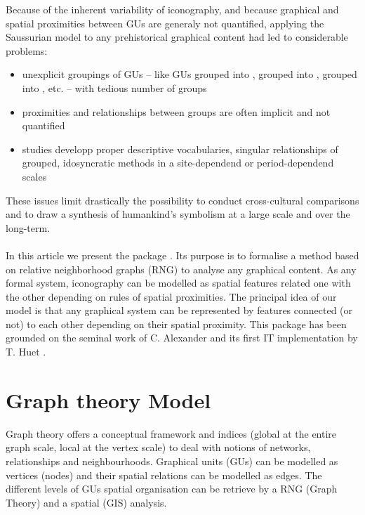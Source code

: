 \documentclass[article]{jss}\usepackage{knitr}
\begin{document}
Because of the inherent variability of iconography, and because graphical and spatial proximities between GUs are generaly not quantified, applying the Saussurian model to any prehistorical graphical content had led to considerable problems:
\begin{itemize}
\setlength\itemsep{.05em}
  \item unexplicit groupings of GUs -- like GUs grouped into ,   grouped into ,  grouped into , etc. -- with tedious number of groups
  \item proximities and relationships between groups are often implicit and not quantified
  \item studies developp proper descriptive vocabularies, singular relationships of grouped, idosyncratic methods in a site-dependend or period-dependend scales 
\end{itemize}

These issues limit drastically the possibility to conduct cross-cultural comparisons and to draw a synthesis of humankind's symbolism at a large scale and over the long-term. 
\\
\\
In this article we present the  package . Its purpose is to formalise a method based on relative neighborhood graphs (RNG) to analyse any graphical content. As any formal system, iconography can be modelled as spatial features related one with the other depending on rules of spatial proximities. The principal idea of our model is that any graphical system can be represented by features connected (or not) to each other depending on their spatial proximity. This package has been grounded on the seminal work of C. Alexander \citep{Alexander08} and its first IT implementation by T. Huet \citep{Huet18a}. 

\section[Model]{Graph theory Model} \label{sec:model}

Graph theory offers a conceptual framework and indices (global at the entire graph scale, local at the vertex scale) to deal with notions of networks, relationships and neighbourhoods. Graphical units (GUs) can be modelled as vertices (nodes) and their spatial relations can be modelled as edges. The different levels of GUs spatial organisation can be retrieve by a RNG (Graph Theory) and a spatial (GIS) analysis.
\end{document}
